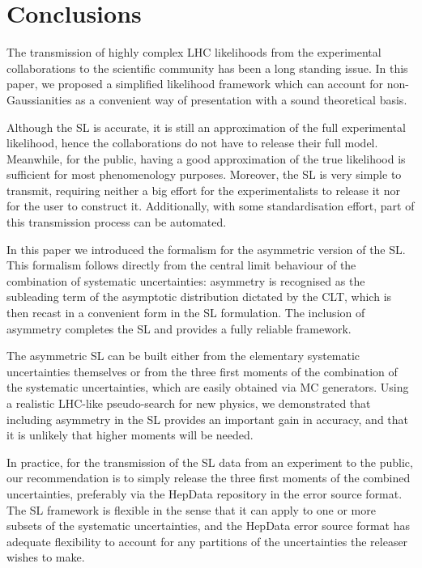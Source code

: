 \documentclass[11pt]{article}
\begin{document}
\section{Conclusions}
\label{se:conclusions}


The transmission of highly complex LHC likelihoods from the experimental collaborations to the scientific community
has been a long standing issue. %
In this paper, we proposed a simplified likelihood framework which can account for non-Gaussianities as a convenient way of presentation 
with a sound theoretical basis. %

Although the SL is  accurate, it is still an approximation of the full experimental likelihood, hence the collaborations 
do not have to release their full %
model.
Meanwhile, for the public, having a good approximation of the true likelihood is sufficient for most phenomenology purposes. 
Moreover, the SL is very simple to transmit, requiring neither a big effort for the experimentalists to release it nor for the user to construct it. Additionally, with some standardisation effort, part of this transmission process can be automated. 

In this paper we introduced the formalism for the asymmetric version of the SL. 
This formalism follows directly from the central limit behaviour of the combination of systematic uncertainties: asymmetry is recognised as the subleading term of the asymptotic distribution dictated by the CLT, which is then recast in a convenient form in the SL formulation. 
The inclusion of asymmetry completes the SL and provides a fully reliable framework.

The asymmetric SL can be built either from the elementary systematic uncertainties themselves or from the three first moments  of the combination of the systematic uncertainties, which are easily obtained via MC generators. 
Using a realistic LHC-like pseudo-search for new physics, we demonstrated that including asymmetry in the SL provides  
an important gain in accuracy, and  that it is unlikely that higher moments will be needed.

In practice, for the transmission of the SL data from an experiment to the public, our recommendation is to simply release the three first moments of the combined uncertainties, preferably via the HepData repository in the error source format.  The SL framework is flexible in the sense that it can apply to one or more subsets of the systematic uncertainties,  and the HepData error source format  has adequate flexibility to account for any partitions of the uncertainties the releaser wishes to make.
\end{document}
